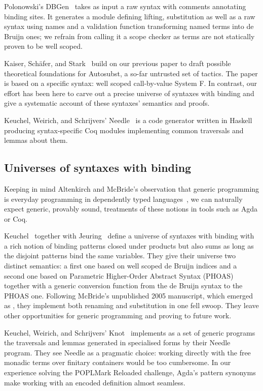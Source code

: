 Polonowski's DBGen~\citeyear{polonowski:db} takes as input a raw syntax with
comments annotating binding sites. It generates a module defining lifting,
substitution as well as a raw syntax using names and a validation function
transforming named terms into de Bruijn ones; we refrain from calling it a
scope checker as terms are not statically proven to be well scoped.

Kaiser, Schäfer, and Stark~\citeyear{Kaiser-wsdebr} build on our previous paper
to draft possible theoretical foundations for Autosubst, a so-far untrusted
set of tactics. The paper is based on a specific syntax: well scoped call-by-value
System F. In contrast, our effort has been here to carve out
a precise universe of syntaxes with binding and give a systematic account
of these syntaxes' semantics and proofs.

Keuchel, Weirich, and Schrijvers' Needle~\citeyear{needleandknot} is a code
generator written in Haskell producing syntax-specific Coq modules
implementing common traversals and lemmas about them.

\subsection{Universes of syntaxes with binding} Keeping in mind Altenkirch
and McBride's observation that generic programming is everyday programming
in dependently typed languages~\citeyear{DBLP:conf/ifip2-1/AltenkirchM02}, we can naturally
expect generic, provably sound, treatments of these notions in tools such as
Agda or Coq.

Keuchel~\citeyear{Keuchel:Thesis:2011} together with Jeuring~\citeyear{DBLP:conf/icfp/KeuchelJ12}
define a universe of syntaxes with binding with a rich notion of binding patterns
closed under products but also sums as long as the disjoint patterns bind the same
variables. They give their universe two distinct semantics: a first one based on well
scoped de Bruijn indices and a second one based on Parametric Higher-Order Abstract
Syntax (PHOAS)~\cite{DBLP:conf/icfp/Chlipala08} together with a generic conversion
function from the de Bruijn syntax to the PHOAS one. Following McBride's unpublished 2005 manuscript, which emerged as \cite{benton2012strongly},
they implement both renaming and substitution in one fell swoop. They leave other
opportunities for generic programming and proving to future work.

Keuchel, Weirich, and Schrijvers' Knot~\citeyear{needleandknot} implements
as a set of generic programs the traversals and lemmas generated in specialised
forms by their Needle program. They see Needle as a pragmatic choice: working
directly with the free monadic terms over finitary containers would be too cumbersome. In
our experience solving the POPLMark Reloaded challenge, Agda's pattern
synonyms make working with an encoded definition almost
seamless.

